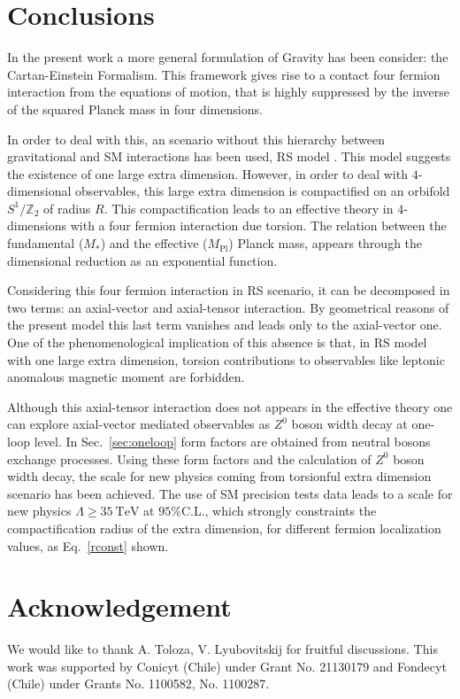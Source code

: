 \documentclass[twocolumn,showpacs,showkeys,prd,superscriptaddress]{revtex4-1}
\begin{document}
\section{\label{sec:conclusions}Conclusions}

In the present work a more general formulation of Gravity has been consider: the Cartan-Einstein Formalism. This framework gives rise to a contact four fermion interaction from the equations of motion, that is highly suppressed by the inverse of the squared Planck mass in four dimensions. 

In order to deal with this, an scenario without this hierarchy between gravitational and SM interactions has been used, RS model \cite{Randall:1999ee}. This model suggests the existence of one large extra dimension. However, in order to deal with $4$-dimensional observables, this large extra dimension is compactified on an orbifold $S^1/\mathbb{Z}_2$ of radius $R$. This compactification leads to an effective theory in $4$-dimensions with a four fermion interaction due torsion. The relation between the fundamental ($M_*$) and the effective ($M_{\text{Pl}}$) Planck mass, appears through the dimensional reduction as an exponential function.  

Considering this four fermion interaction in RS scenario, it can be decomposed in two terms: an axial-vector and axial-tensor interaction. By geometrical reasons of the present model this last term vanishes and leads only to the axial-vector one. One of the phenomenological implication of this absence is that, in RS model with one large extra dimension, torsion contributions to observables like leptonic anomalous magnetic moment are forbidden. 

Although this axial-tensor interaction does not appears in the effective theory one can explore axial-vector mediated observables as $Z^0$ boson width decay at one-loop level. In Sec.~\ref{sec:oneloop} form factors are obtained from neutral bosons exchange processes. Using these form factors and the calculation of $Z^0$ boson width decay, the scale for new physics coming from torsionful extra dimension scenario has been achieved. The use of SM precision tests data leads to a scale for new physics $ \Lambda \geq \SI{35}{\TeV}$ at $95\% \text{C.L.}$, which strongly constraints the compactification radius of the extra dimension, for different fermion localization values, as Eq.~\eqref{rconst} shown.




\section*{Acknowledgement}

We would like to thank A. Toloza, V. Lyubovitskij for fruitful discussions. This work was supported by Conicyt (Chile) under Grant No. 21130179 and Fondecyt (Chile) under Grants No. 1100582, No. 1100287.






\end{document}
